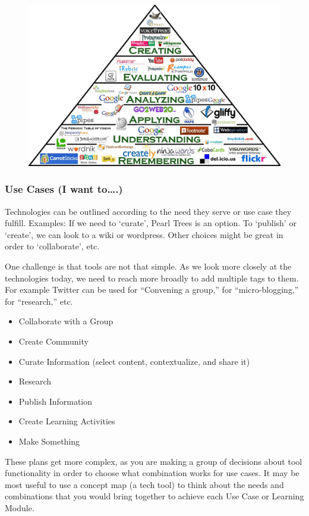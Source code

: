 \begin{figure}[htbp]
\centering
\includegraphics[width=.65\textwidth]{../pictures/blooms.jpg}
\end{figure}

\subsubsection{Use Cases (I want to\ldots{}.)}

Technologies can be outlined according to the need they serve or use
case they fulfill. Examples: If we need to `curate', Pearl Trees is an
option. To `publish' or `create', we can look to a wiki or wordpress.
Other choices might be great in order to `collaborate', etc.

One challenge is that tools are not that simple. As we look more closely
at the technologies today, we need to reach more broadly to add multiple
tags to them. For example Twitter can be used for ``Convening a group,''
for ``micro-blogging,'' for ``research,'' etc.

\begin{itemize}
\item
  Collaborate with a Group
\end{itemize}
\begin{itemize}
\item
  Create Community
\end{itemize}
\begin{itemize}
\item
  Curate Information (select content, contextualize, and share it)
\end{itemize}
\begin{itemize}
\item
  Research
\end{itemize}
\begin{itemize}
\item
  Publish Information
\end{itemize}
\begin{itemize}
\item
  Create Learning Activities
\end{itemize}
\begin{itemize}
\item
  Make Something
\end{itemize}
These plans get more complex, as you are making a group of decisions
about tool functionality in order to choose what combination works for
use cases. It may be most useful to use a concept map (a tech tool) to
think about the needs and combinations that you would bring together to
achieve each Use Case or Learning Module.

